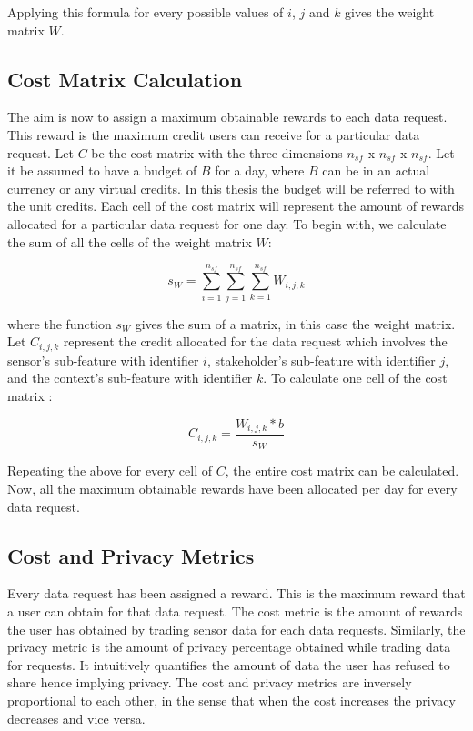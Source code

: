 Applying this formula for every possible values of $i$, $j$ and $k$ gives the weight matrix $W$.

\subsection{Cost Matrix Calculation}

The aim is now to assign a maximum obtainable rewards to each data request. This reward is the maximum credit users can receive for a particular data request. Let $C$ be the cost matrix with the three dimensions $n_{sf}$ x $n_{sf}$ x $n_{sf}$.
Let it be assumed to have a budget of $B$ for a day, where
$B$ can be in an actual currency or any virtual credits. In this thesis the budget will be referred to with the unit credits. Each cell of the cost matrix will represent the amount of rewards allocated for a particular data request for one day.
To begin with, we calculate the sum of all the cells of the weight matrix $W$:

\begin{equation}
s_{W} = \sum\limits_{i=1}^{n_{sf}} \sum\limits_{j=1}^{n_{sf}} \sum\limits_{k=1}^{n_{sf}} W_{i,j,k}
\end{equation}

where the function $s_{W}$ gives the sum of a matrix, in this case the weight matrix.
Let $C_{i,j,k}$ represent the credit allocated for the data request which involves the sensor's sub-feature with identifier $i$, stakeholder's sub-feature with identifier $j$, and the context's sub-feature with identifier $k$. To calculate one cell of the cost matrix :

\begin{equation}
C_{i,j,k} = \frac{W_{i,j,k} * b}{s_{W}}
\end{equation}

Repeating the above for every cell of $C$, the entire cost matrix can be calculated. Now, all the maximum obtainable rewards have been allocated per day for every data request.

\subsection{Cost and Privacy Metrics} \label{o}
Every data request has been assigned a reward. This is the maximum reward that a user can obtain for that data request.
The cost metric is the amount of rewards the user has obtained by trading sensor data for each data requests. Similarly, the privacy metric is the amount of privacy percentage obtained while trading data for requests. It intuitively quantifies the amount of data the user has refused to share hence implying privacy. The cost and privacy metrics are inversely proportional to each other, in the sense that when the cost increases the privacy decreases and vice versa.

